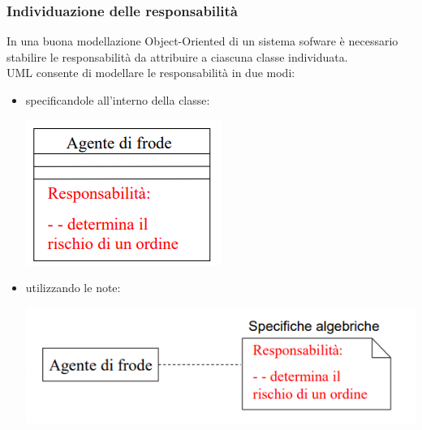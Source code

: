 \documentclass{article}
\begin{document}
	\subsubsection{Individuazione delle responsabilità}
	In una buona modellazione Object-Oriented di un sistema sofware è necessario stabilire le responsabilità da attribuire a ciascuna classe individuata.
	\vspace{\baselineskip} \\
	UML consente di modellare le responsabilità in due modi:
	\begin{itemize}
		\item specificandole all'interno della classe:
		\begin{center}
			\includegraphics[scale=0.7]{assets/responsabilita_interna.png}
		\end{center}
		\item utilizzando le note:
		\begin{center}
			\includegraphics[scale=0.7]{assets/responsabilita_note.png}
		\end{center}
	\end{itemize}
\end{document}

